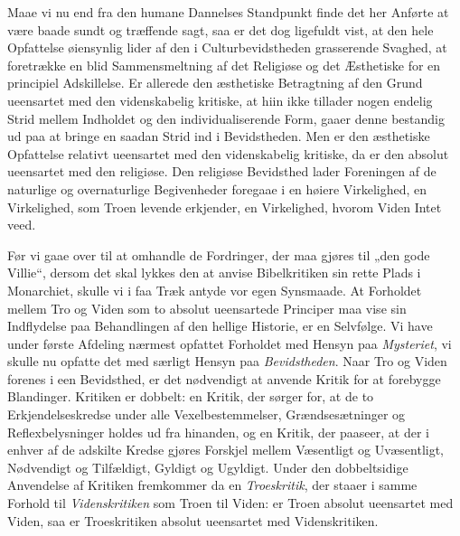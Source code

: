 \documentclass[12pt]{book}
\newcommand{\opage}[1]{\marginnote{\footnotesize\textit{[#1]}}}
\begin{document}
Maae vi nu end fra den humane Dannelses Standpunkt
finde det her Anførte at være baade sundt og træffende sagt,
saa er det dog ligefuldt vist, at den hele Opfattelse øiensynlig
lider af den i Culturbevidstheden grasserende Svaghed, at
foretrække en blid Sammensmeltning af det Religiøse og det
Æsthetiske for en principiel Adskillelse. Er allerede den
æsthetiske Betragtning af den Grund ueensartet med den
\opage{58}\setcounter{footnote}{0}%
videnskabelig kritiske, at hiin ikke tillader nogen endelig Strid
mellem Indholdet og den individualiserende Form, gaaer
denne bestandig ud paa at bringe en saadan Strid ind i
Bevidstheden. Men er den æsthetiske Opfattelse relativt
ueensartet med den videnskabelig kritiske, da er den absolut
ueensartet med den religiøse. Den religiøse Bevidsthed lader
Foreningen af de naturlige og overnaturlige Begivenheder
foregaae i en høiere Virkelighed, en Virkelighed, som Troen
levende erkjender, en Virkelighed, hvorom Viden Intet veed.

Før vi gaae over til at omhandle de Fordringer, der
maa gjøres til „den gode Villie“, dersom det skal lykkes den
at anvise Bibelkritiken sin rette Plads i Monarchiet, skulle
vi i faa Træk antyde vor egen Synsmaade. At Forholdet
mellem Tro og Viden som to absolut ueensartede Principer
maa vise sin Indflydelse paa Behandlingen af den hellige
Historie, er en Selvfølge. Vi have under første Afdeling
nærmest opfattet Forholdet med Hensyn paa \emph{Mysteriet},
vi skulle nu opfatte det med særligt Hensyn paa \emph{Bevidstheden}.
Naar Tro og Viden forenes i een Bevidsthed, er
det nødvendigt at anvende Kritik for at forebygge Blandinger.
Kritiken er dobbelt: en Kritik, der sørger for, at de to Erkjendelseskredse
under alle Vexelbestemmelser, Grændsesætninger
og Reflexbelysninger holdes ud fra hinanden, og en Kritik,
der paaseer, at der i enhver af de adskilte Kredse gjøres
Forskjel mellem Væsentligt og Uvæsentligt, Nødvendigt og
Tilfældigt, Gyldigt og Ugyldigt. Under den dobbeltsidige
Anvendelse af Kritiken fremkommer da en \emph{Troeskritik},
der staaer i samme Forhold til \emph{Videnskritiken} som
Troen til Viden: er Troen absolut ueensartet med Viden,
saa er Troeskritiken absolut ueensartet med Videnskritiken.
\end{document}
